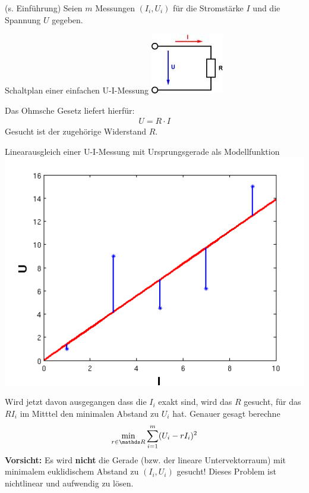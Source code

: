 \begin{Bspe}
  (s. Einführung)
  Seien $m$ Messungen $(I_i, U_i)$ für die Stromstärke $I$ und die Spannung $U$ gegeben.
  \begin{image}{Schaltplan einer einfachen U-I-Messung}
    \includegraphics{images/ohmsche.jpeg}
  \end{image}
  Das Ohmsche Gesetz liefert hierfür:
  \begin{gather*}
    U=R\cdot I
  \end{gather*}
  Gesucht ist der zugehörige Widerstand $R$.
  \begin{image}{Linearausgleich einer U-I-Messung mit Ursprungsgerade als Modellfunktion}
    \includegraphics[width=0.5\linewidth]{images/linausgl2.png}
  \end{image}
  Wird jetzt davon ausgegangen dass die $I_i$ exakt sind, wird das $R$ gesucht, 
  für das $RI_i$ im Mitttel den minimalen Abstand zu $U_i$ hat.
  Genauer gesagt berechne
  \begin{gather*}
    \min_{r\in\R} \sum_{i=1}^{m}(U_i-rI_i)^2
  \end{gather*}
  \textbf{Vorsicht: } Es wird \textbf{nicht} die Gerade (bzw. der lineare Untervektorraum) mit 
  minimalem euklidischem Abstand zu $(I_i,U_i)$ gesucht!
  Dieses Problem ist nichtlinear und aufwendig zu lösen.
\end{Bspe}


